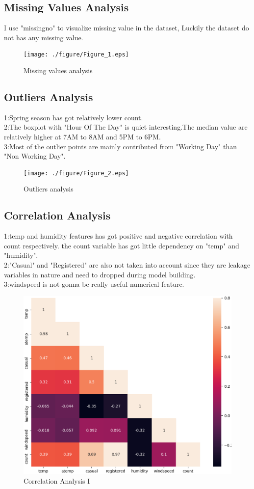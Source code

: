 \documentclass{amsart}
\begin{document}
\subsection{Missing Values Analysis}
I use "missingno" to visualize missing value in the dataset, Luckily the dataset do not has any missing value.\\
\begin{figure}[htbp]
	\texttt{[image: ./figure/Figure\_1.eps]}
	\caption{Missing values analysis}
\end{figure}

\subsection{Outliers Analysis}
1:Spring season has got relatively lower count. \\
2:The boxplot with "Hour Of The Day" is quiet interesting.The median value are relatively higher at 7AM to 8AM and 5PM to 6PM.\\
3:Most of the outlier points are mainly contributed from "Working Day" than "Non Working Day". 
\begin{figure}[htbp]
	\texttt{[image: ./figure/Figure\_2.eps]}
	\caption{Outliers analysis}
\end{figure}

\subsection{Correlation Analysis}
1:temp and humidity features has got positive and negative correlation with count respectively. the count variable has got little dependency on "temp" and "humidity". \\
2:"Casual" and "Registered" are also not taken into account since they are leakage variables in nature and need to dropped during model building. \\
3:windspeed is not gonna be really useful numerical feature.
\begin{figure}[htbp]
	\includegraphics[scale=0.5]{./figure/Figure_3.eps}
	\caption{Correlation Analysis I}
\end{figure}
\end{document}
